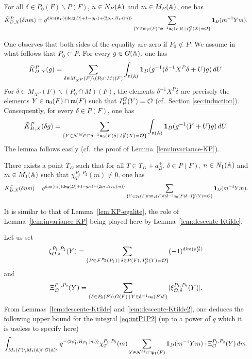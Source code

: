 \begin{paragr}
\begin{preuve}
\begin{lemme}\label{lem:descente-Ktilde}
For all $\delta\in P_0(F)\backslash P(F)$, $n\in N_P(\mathbb{A})$ and $m\in M_P(\mathbb{A})$, one has
$$\tilde{K}^P_{D,X}(\delta nm)=q^{\dim(\mathfrak{n}_P)(\deg(D)+1-g_C)+\langle 2\rho_P,H_P(m)\rangle}\sum_{\{Y\in \mathfrak{m}_P(F)\cap \delta^{-1}\mathfrak{n}_0(F)\delta\,|\,I_P^G(X)=\mathcal{O}\}} \mathbf{1}_D(m^{-1}Ym).$$
\end{lemme}

\begin{preuve}
One observes that both sides of the equality are zero if $P_0\not\subset P$. We assume in what follows that $P_0\subset P$. For every $g\in G(\mathbb{A})$, one has
$$\tilde{K}^P_{D,X}(g)=\sum_{\delta\in M_{X^P}(F)\backslash (P_0\cap M)(F)} \int_{\mathfrak{n}(\mathbb{A})} \mathbf{1}_D(g^{-1}(\delta^{-1}X^P\delta+U)g)\, dU.$$
For $\delta\in M_{X^P}(F)\backslash (P_0\cap M)(F)$, the elements $\delta^{-1}X^P\delta$ are precisely the elements $Y\in \mathfrak{n}_0(F)\cap \mathfrak{m}(F)$ such that $I_P^G(Y)=\mathcal{O}$ (cf.\ Section \ref{sec:induction}). Consequently, for every $\delta\in P(F)$, one has
$$\tilde{K}^P_{D,X}(\delta g)=\sum_{\{Y\in \mathcal{N}^{M_P}\cap \delta^{-1}\mathfrak{n}_0(F)\delta\,|\,I_P^G(X)=\mathcal{O}\}} \int_{\mathfrak{n}(\mathbb{A})} \mathbf{1}_D(g^{-1}(Y+U)g)\, dU.$$
The lemma follows easily (cf.\ the proof of Lemma~\ref{lem:invariance-KP}).
\end{preuve}

\begin{lemme}\label{lem:descente-Ktilde2}
There exists a point $T_D$ such that for all $T\in T_D+a_B^+$, $\delta\in P(F)$, $n\in N_1(\mathbb{A})$ and $m\in M_1(\mathbb{A})$ such that $\chi_T^{P_1,P_2}(m)\neq 0$, one has
\begin{equation}
  \label{eq:descente-Ktilde2}
  \tilde{K}^P_{D,X}(\delta nm)=q^{\dim(\mathfrak{n}_2)(\deg(D)+1-g_C)+\langle 2\rho_2,H_{P_2}(m)\rangle}\sum_{\{Y\in \mathfrak{p}_1(F)\cap \mathfrak{m}_2(F)\cap \delta^{-1}\mathfrak{n}_0(F)\delta\,|\,I_P^G(Y)=\mathcal{O}\}} \mathbf{1}_D(m^{-1}Ym).
\end{equation}
\end{lemme}

\begin{preuve}
It is similar to that of Lemma~\ref{lem:KP-egalite}, the role of Lemma~\ref{lem:invariance-KP} being played here by Lemma~\ref{lem:descente-Ktilde}.
\end{preuve}

Let us set
$$\xi^{P_1,P_2}_{\mathcal{O},\delta}(Y)=\sum_{\{P\in \mathcal{F}^{P_2}(P_1)\,|\,\delta\in P(F),\,I_P^G(Y)=\mathcal{O}\}} (-1)^{\dim(a_P^G)}$$
and
$$\Xi^{P_1,P_2}_{\mathcal{O}}(Y)=\sum_{\{\delta\in P_0(F)\backslash G(F)\,|\,Y\in \delta^{-1}\mathfrak{n}_0(F)\delta\}} |\xi^{P_1,P_2}_{\mathcal{O},\delta}(Y)|.$$
From Lemmas~\ref{lem:descente-Ktilde} and \ref{lem:descente-Ktilde2}, one deduces the following upper bound for the integral \eqref{eq:intP1P2} (up to a power of $q$ which it is useless to specify here)
$$\int_{M_1(F)\backslash M_1(\mathbb{A})\cap G(\mathbb{A})^e} q^{-\langle 2\rho_1^2,H_{P_1}(m)\rangle}\chi_T^{P_1,P_2}(m)\sum_{Y\in \mathcal{N}^{M_2}\cap \mathfrak{p}_1(F)} \mathbf{1}_D(m^{-1}Ym)\cdot \Xi^{P_1,P_2}_{\mathcal{O}}(Y)\, dm.$$


\end{preuve}
\end{paragr}
